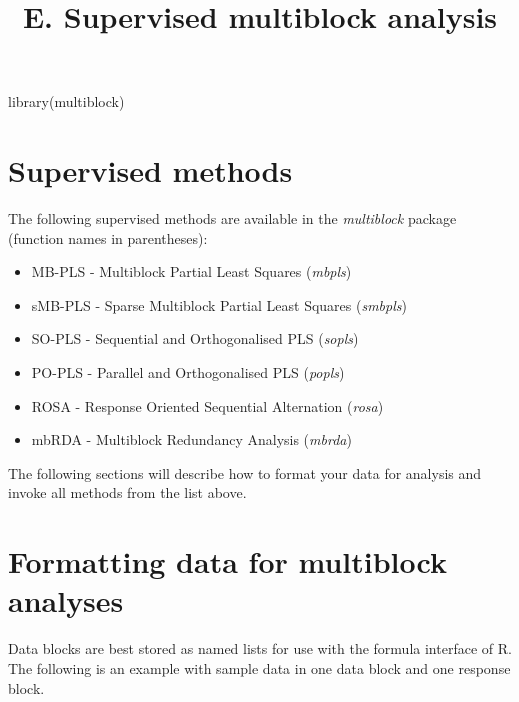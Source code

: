 \documentclass[
]{article}
\title{E. Supervised multiblock analysis}
\author{}
\date{\vspace{-2.5em}}
\newenvironment{Shaded}{\begin{snugshade}}{\end{snugshade}}
\newcommand{\FunctionTok}[1]{\textcolor[rgb]{0.00,0.00,0.00}{#1}}
\newcommand{\NormalTok}[1]{#1}
\providecommand{\tightlist}{%
  \setlength{\itemsep}{0pt}\setlength{\parskip}{0pt}}
\begin{document}
\maketitle

\begin{Shaded}
\begin{Highlighting}[]
\FunctionTok{library}\NormalTok{(multiblock)}
\end{Highlighting}
\end{Shaded}

\hypertarget{supervised-methods}{%
\section{Supervised methods}\label{supervised-methods}}

The following supervised methods are available in the \emph{multiblock}
package (function names in parentheses):

\begin{itemize}
\tightlist
\item
  MB-PLS - Multiblock Partial Least Squares (\emph{mbpls})
\item
  sMB-PLS - Sparse Multiblock Partial Least Squares (\emph{smbpls})
\item
  SO-PLS - Sequential and Orthogonalised PLS (\emph{sopls})
\item
  PO-PLS - Parallel and Orthogonalised PLS (\emph{popls})
\item
  ROSA - Response Oriented Sequential Alternation (\emph{rosa})
\item
  mbRDA - Multiblock Redundancy Analysis (\emph{mbrda})
\end{itemize}

The following sections will describe how to format your data for
analysis and invoke all methods from the list above.

\hypertarget{formatting-data-for-multiblock-analyses}{%
\section{Formatting data for multiblock
analyses}\label{formatting-data-for-multiblock-analyses}}

Data blocks are best stored as named lists for use with the formula
interface of R. The following is an example with sample data in one data
block and one response block.
\end{document}
